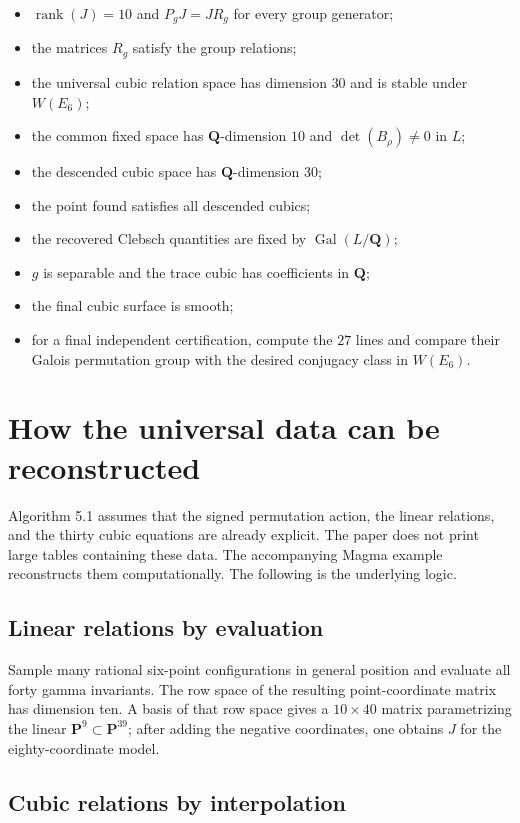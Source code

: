 \documentclass[11pt]{article}
\newcommand{\QQ}{\mathbf{Q}}
\newcommand{\PP}{\mathbf{P}}
\newcommand{\Gal}{\operatorname{Gal}}
\newcommand{\rank}{\operatorname{rank}}
\begin{document}
\begin{itemize}
\item $\rank(J)=10$ and $P_gJ=JR_g$ for every group generator;
\item the matrices $R_g$ satisfy the group relations;
\item the universal cubic relation space has dimension $30$ and is stable
under $W(E_6)$;
\item the common fixed space has $\QQ$-dimension $10$ and
$\det(B_{\rho})\neq0$ in $L$;
\item the descended cubic space has $\QQ$-dimension $30$;
\item the point found satisfies all descended cubics;
\item the recovered Clebsch quantities are fixed by $\Gal(L/\QQ)$;
\item $g$ is separable and the trace cubic has coefficients in $\QQ$;
\item the final cubic surface is smooth;
\item for a final independent certification, compute the $27$ lines and
compare their Galois permutation group with the desired conjugacy class in
$W(E_6)$.
\end{itemize}

\section{How the universal data can be reconstructed}

Algorithm 5.1 assumes that the signed permutation action, the linear
relations, and the thirty cubic equations are already explicit.  The paper
does not print large tables containing these data.  The accompanying Magma
example reconstructs them computationally.  The following is the underlying
logic.

\subsection{Linear relations by evaluation}

Sample many rational six-point configurations in general position and
evaluate all forty gamma invariants.  The row space of the resulting
point-coordinate matrix has dimension ten.  A basis of that row space gives
a $10\times40$ matrix parametrizing the linear $\PP^9\subset\PP^{39}$; after
adding the negative coordinates, one obtains $J$ for the eighty-coordinate
model.

\subsection{Cubic relations by interpolation}
\end{document}
